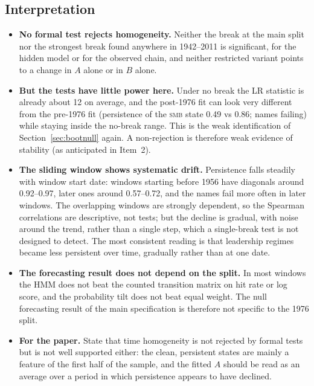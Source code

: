 \documentclass[11pt]{article}
\newcommand{\SMB}{\textsc{smb}}
\begin{document}
\subsection{Interpretation}
\begin{itemize}
\item \textbf{No formal test rejects homogeneity.} Neither the break at the main split nor the strongest break found anywhere in 1942--2011 is significant, for the hidden model or for the observed chain, and neither restricted variant points to a change in $A$ alone or in $B$ alone.
\item \textbf{But the tests have little power here.} Under no break the LR statistic is already about 12 on average, and the post-1976 fit can look very different from the pre-1976 fit (persistence of the \SMB{} state 0.49 vs 0.86; names failing) while staying inside the no-break range. This is the weak identification of Section~\ref{sec:bootnull} again. A non-rejection is therefore weak evidence of stability (as anticipated in Item~2).
\item \textbf{The sliding window shows systematic drift.} Persistence falls steadily with window start date: windows starting before 1956 have diagonals around 0.92--0.97, later ones around 0.57--0.72, and the names fail more often in later windows. The overlapping windows are strongly dependent, so the Spearman correlations are descriptive, not tests; but the decline is gradual, with noise around the trend, rather than a single step, which a single-break test is not designed to detect. The most consistent reading is that leadership regimes became less persistent over time, gradually rather than at one date.
\item \textbf{The forecasting result does not depend on the split.} In most windows the HMM does not beat the counted transition matrix on hit rate or log score, and the probability tilt does not beat equal weight. The null forecasting result of the main specification is therefore not specific to the 1976 split.
\item \textbf{For the paper.} State that time homogeneity is not rejected by formal tests but is not well supported either: the clean, persistent states are mainly a feature of the first half of the sample, and the fitted $A$ should be read as an average over a period in which persistence appears to have declined.
\end{itemize}
\end{document}

